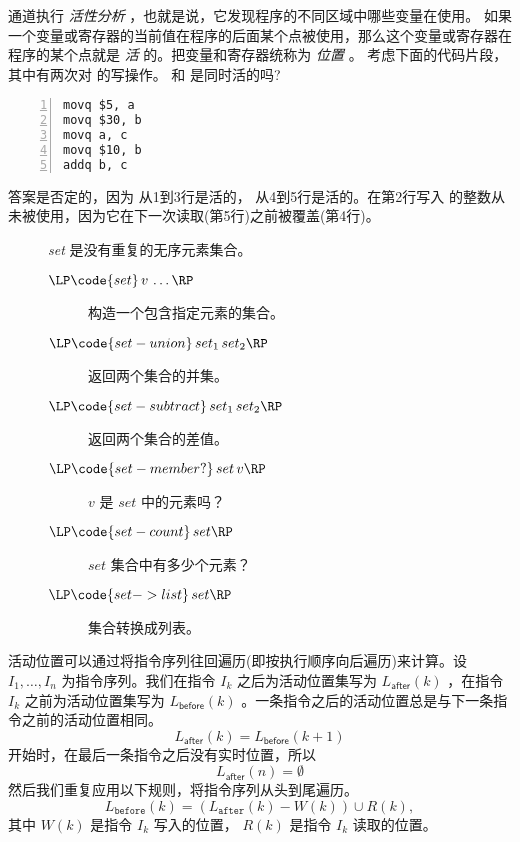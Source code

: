 \documentclass[11pt]{book}
\begin{document}
  通道执行 \emph{活性分析} ，也就是说，它发现程序的不同区域中哪些变量在使用。
%
如果一个变量或寄存器的当前值在程序的后面某个点被使用，那么这个变量或寄存器在程序的某个点就是 \emph{活} 的。把变量和寄存器统称为 \emph{位置} 。
%
考虑下面的代码片段，其中有两次对
 的写操作。  和  是同时活的吗?
\begin{center}
  \begin{minipage}{0.96\textwidth}
\begin{lstlisting}[numbers=left,numberstyle=\tiny]
movq $5, a
movq $30, b
movq a, c
movq $10, b
addq b, c
\end{lstlisting}
\end{minipage}
\end{center}
答案是否定的，因为  从1到3行是活的，
 从4到5行是活的。在第2行写入  的整数从未被使用，因为它在下一次读取(第5行)之前被覆盖(第4行)。

\begin{wrapfigure}[19]{l}[1.0in]{0.6\textwidth}
  \small
  \begin{tcolorbox}[title=\href{https://docs.racket-lang.org/reference/sets.html}{ Racket 集合包}]
    \emph{set} 是没有重复的无序元素集合。
  \begin{description}
  \item[$\LP\code{set}\,v\,\ldots\RP$] 构造一个包含指定元素的集合。
  \item[$\LP\code{set-union}\,set_1\,set_2\RP$] 返回两个集合的并集。
  \item[$\LP\code{set-subtract}\,set_1\,set_2\RP$] 返回两个集合的差值。
  \item[$\LP\code{set-member?}\,set\,v\RP$] $v$ 是 $set$ 中的元素吗？
  \item[$\LP\code{set-count}\,set\RP$] $set$ 集合中有多少个元素？
  \item[$\LP\code{set->list}\,set\RP$] 集合转换成列表。
  \end{description}
  \end{tcolorbox}
\end{wrapfigure}

活动位置可以通过将指令序列往回遍历(即按执行顺序向后遍历)来计算。设
$I_1,\ldots, I_n$ 为指令序列。我们在指令  $I_k$ 之后为活动位置集写为
$L_{\mathsf{after}}(k)$ ，在指令 $I_k$ 之前为活动位置集写为 $L_{\mathsf{before}}(k)$ 。一条指令之后的活动位置总是与下一条指令之前的活动位置相同。  
\begin{equation} \label{eq:live-after-before-next}
  L_{\mathsf{after}}(k) = L_{\mathsf{before}}(k+1)
\end{equation}
开始时，在最后一条指令之后没有实时位置，所以
\begin{equation}\label{eq:live-last-empty}
  L_{\mathsf{after}}(n) = \emptyset
\end{equation}
然后我们重复应用以下规则，将指令序列从头到尾遍历。
\begin{equation}\label{eq:live-before-after-minus-writes-plus-reads}
  L_{\mathtt{before}}(k) = (L_{\mathtt{after}}(k) - W(k)) \cup R(k),
\end{equation}
其中 $W(k)$ 是指令 $I_k$ 写入的位置，
$R(k)$ 是指令 $I_k$ 读取的位置。
\end{document}
